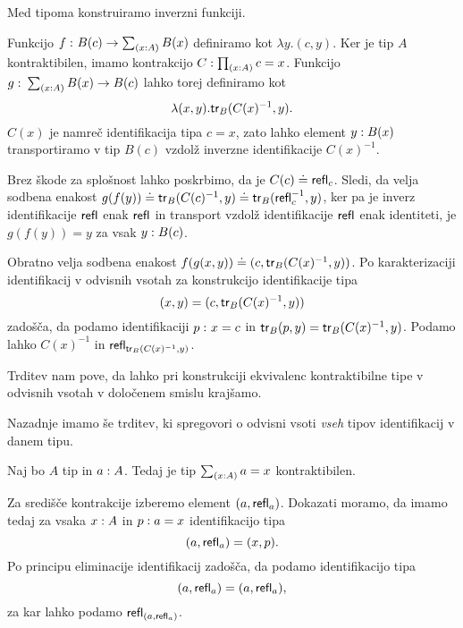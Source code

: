 \begin{dokaz}
  Med tipoma konstruiramo inverzni funkciji.

  Funkcijo \(f \,\colon B(c) \to \textstyle \sum_{\left( x : A \right)} B(x)\) definiramo kot \(\lambda y. (c, y)\). Ker je tip \(A\) kontraktibilen, imamo kontrakcijo \(C : \textstyle \prod_{\left( x : A \right)} c = x\).
  Funkcijo \(g \,\colon \textstyle \sum_{\left( x : A \right)} B(x) \to B(c)\) lahko torej definiramo kot
  \[\lambda (x, y).\textnormal{\textsf{tr}}_{B}(C(x)^{-1}, y).\]  \(C(x)\) je namreč identifikacija tipa \(c = x\), zato lahko element \(y : B(x)\) transportiramo v tip \(B(c)\) vzdolž inverzne identifikacije \(C(x)^{-1}\).

  Brez škode za splošnost lahko poskrbimo, da je \(C(c) \doteq \textnormal{\textsf{refl}}_{c}\). Sledi, da velja sodbena enakost \(g(f(y)) \doteq \textnormal{\textsf{tr}}_{B}(C(c)^{-1}, y) \doteq \textnormal{\textsf{tr}}_{B}(\textnormal{\textsf{refl}}_{c}^{-1}, y)\),  ker pa je inverz identifikacije \(\textnormal{\textsf{refl}}_{}\) enak \(\textnormal{\textsf{refl}}_{}\) in transport vzdolž identifikacije \(\textnormal{\textsf{refl}}_{}\) enak identiteti, je \(g(f(y)) = y\) za vsak \(y : B(c)\).

  Obratno velja sodbena enakost \(f(g(x, y)) \doteq (c, \textnormal{\textsf{tr}}_{B}(C(x)^{-1}, y))\). Po karakterizaciji identifikacij v odvisnih vsotah za konstrukcijo identifikacije tipa
  \[(x, y) = (c, \textnormal{\textsf{tr}}_{B}(C(x)^{-1}, y))\] zadošča, da podamo identifikaciji \(p \,\colon x = c\) in \(\textnormal{\textsf{tr}}_{B}(p, y) = \textnormal{\textsf{tr}}_{B}(C(x)^{-1}, y)\). Podamo lahko \(C(x)^{-1}\) in \(\textnormal{\textsf{refl}}_{\textnormal{\textsf{tr}}_{B}(C(x)^{-1}, y)}\).
\end{dokaz}

Trditev nam pove, da lahko pri konstrukciji ekvivalenc kontraktibilne tipe v odvisnih vsotah v določenem smislu krajšamo.

Nazadnje imamo še trditev, ki spregovori o odvisni vsoti \emph{vseh} tipov identifikacij v danem tipu.

\begin{trditev}
  \label{cover-contr}
  Naj bo \(A\) tip in \(a : A\). Tedaj je tip \(\textstyle \sum_{\left( x : A \right)} a = x\) kontraktibilen.
\end{trditev}

\begin{dokaz}
  Za središče kontrakcije izberemo element \((a, \textnormal{\textsf{refl}}_{a})\). Dokazati moramo, da imamo tedaj za vsaka \(x : A\) in \(p : a = x\) identifikacijo tipa
  \[(a, \textnormal{\textsf{refl}}_{a}) = (x, p).\]
  Po principu eliminacije identifikacij zadošča, da podamo identifikacijo tipa
  \[(a, \textnormal{\textsf{refl}}_{a}) = (a, \textnormal{\textsf{refl}}_{a}),\] za kar lahko podamo \(\textnormal{\textsf{refl}}_{(a, \textnormal{\textsf{refl}}_{a})}\).
\end{dokaz}

